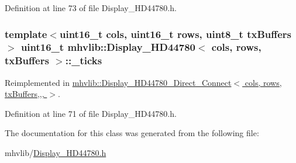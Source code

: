 Definition at line 73 of file Display\-\_\-\-H\-D44780.\-h.

\hypertarget{classmhvlib_1_1_display___h_d44780_a22c01174d10b5567e3862f05c4e3ffe4}{
\subsubsection[{\-\_\-ticks}]{\setlength{\rightskip}{0pt plus 5cm}template$<$uint16\-\_\-t cols, uint16\-\_\-t rows, uint8\-\_\-t tx\-Buffers$>$ uint16\-\_\-t {\bf mhvlib\-::\-Display\-\_\-\-H\-D44780}$<$ cols, rows, tx\-Buffers $>$\-::\-\_\-ticks\hspace{0.3cm}{\ttfamily [protected]}}}\label{classmhvlib_1_1_display___h_d44780_a22c01174d10b5567e3862f05c4e3ffe4}


Reimplemented in \hyperlink{classmhvlib_1_1_display___h_d44780___direct___connect_a0ce9e9fada2886430619900c3a130049}{mhvlib\-::\-Display\-\_\-\-H\-D44780\-\_\-\-Direct\-\_\-\-Connect$<$ cols, rows, tx\-Buffers,,, $>$}.



Definition at line 71 of file Display\-\_\-\-H\-D44780.\-h.



The documentation for this class was generated from the following file\-:\begin{DoxyCompactItemize}
\item 
mhvlib/\hyperlink{_display___h_d44780_8h}{Display\-\_\-\-H\-D44780.\-h}\end{DoxyCompactItemize}
